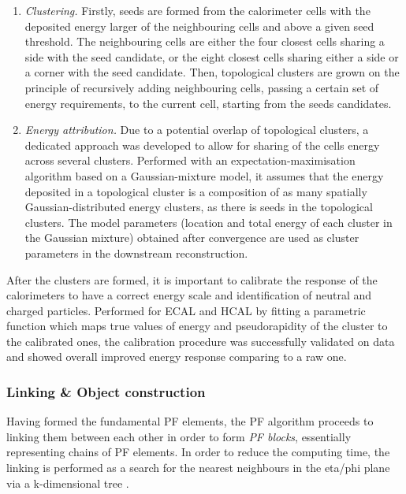 \begin{enumerate}
    \item \textit{Clustering.} Firstly, seeds are formed from the calorimeter cells with the deposited energy larger of the neighbouring cells and above a given seed threshold. The neighbouring cells are either the four closest cells sharing a side with the seed candidate, or the eight closest cells sharing either a side or a corner with the seed candidate. Then, topological clusters are grown on the principle of recursively adding neighbouring cells, passing a certain set of energy requirements, to the current cell, starting from the seeds candidates.
    \item \textit{Energy attribution.} Due to a potential overlap of topological clusters, a dedicated approach was developed to allow for sharing of the cells energy across several clusters. Performed with an expectation-maximisation algorithm based on a Gaussian-mixture model, it assumes that the energy deposited in a topological cluster is a composition of as many spatially Gaussian-distributed energy clusters, as there is seeds in the topological clusters. The model parameters (location and total energy of each cluster in the Gaussian mixture) obtained after convergence are used as cluster parameters in the downstream reconstruction. 
\end{enumerate}

After the clusters are formed, it is important to calibrate the response of the calorimeters to have a correct energy scale and identification of neutral and charged particles. Performed for ECAL \cite{CMS:2013lxn} and HCAL \cite{CMS:2019hpr} by fitting a parametric function which maps true values of energy and pseudorapidity of the cluster to the calibrated ones, the calibration procedure was successfully validated on data and showed overall improved energy response comparing to a raw one.

\subsubsection{Linking \& Object construction}
Having formed the fundamental PF elements, the PF algorithm proceeds to linking them between each other in order to form \textit{PF blocks}, essentially representing chains of PF elements. In order to reduce the computing time, the linking is performed as a search for the nearest neighbours in the eta/phi plane via a k-dimensional tree \cite{10.1145/361002.361007}.

